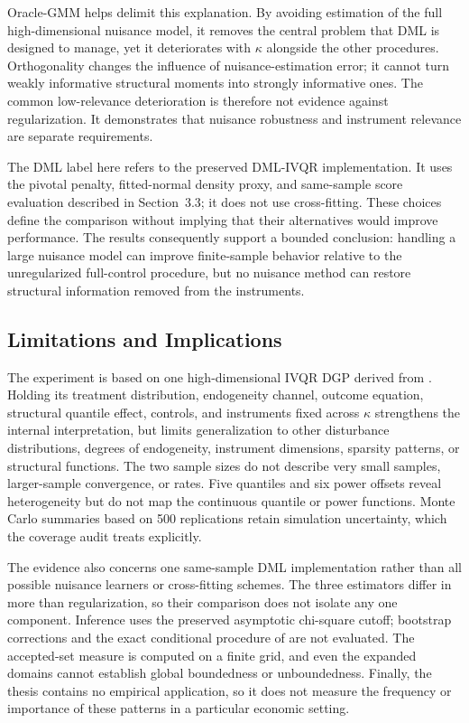 Oracle-GMM helps delimit this explanation. By avoiding estimation of the full high-dimensional nuisance model, it removes the central problem that DML is designed to manage, yet it deteriorates with $\kappa$ alongside the other procedures. Orthogonality changes the influence of nuisance-estimation error; it cannot turn weakly informative structural moments into strongly informative ones. The common low-relevance deterioration is therefore not evidence against regularization. It demonstrates that nuisance robustness and instrument relevance are separate requirements.

The DML label here refers to the preserved DML-IVQR implementation. It uses the pivotal penalty, fitted-normal density proxy, and same-sample score evaluation described in Section~3.3; it does not use cross-fitting. These choices define the comparison without implying that their alternatives would improve performance. The results consequently support a bounded conclusion: handling a large nuisance model can improve finite-sample behavior relative to the unregularized full-control procedure, but no nuisance method can restore structural information removed from the instruments.

\subsection{Limitations and Implications}

The experiment is based on one high-dimensional IVQR DGP derived from \textcite{chen_huang_tien_2021}. Holding its treatment distribution, endogeneity channel, outcome equation, structural quantile effect, controls, and instruments fixed across $\kappa$ strengthens the internal interpretation, but limits generalization to other disturbance distributions, degrees of endogeneity, instrument dimensions, sparsity patterns, or structural functions. The two sample sizes do not describe very small samples, larger-sample convergence, or rates. Five quantiles and six power offsets reveal heterogeneity but do not map the continuous quantile or power functions. Monte Carlo summaries based on 500 replications retain simulation uncertainty, which the coverage audit treats explicitly.

The evidence also concerns one same-sample DML implementation rather than all possible nuisance learners or cross-fitting schemes. The three estimators differ in more than regularization, so their comparison does not isolate any one component. Inference uses the preserved asymptotic chi-square cutoff; bootstrap corrections and the exact conditional procedure of \textcite{chernozhukov_hansen_jansson_2009} are not evaluated. The accepted-set measure is computed on a finite grid, and even the expanded domains cannot establish global boundedness or unboundedness. Finally, the thesis contains no empirical application, so it does not measure the frequency or importance of these patterns in a particular economic setting.

